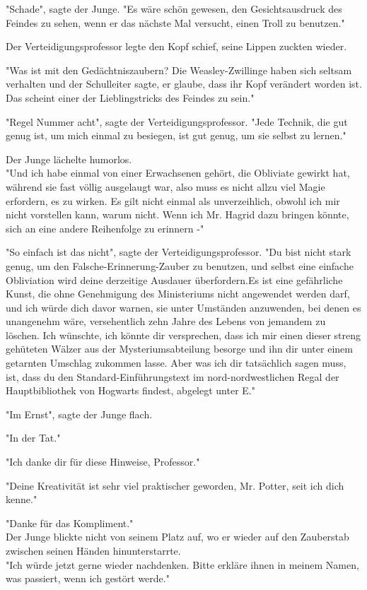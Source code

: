 {"Schade", sagte der Junge. "Es wäre schön gewesen, den Gesichtsausdruck des Feindes zu sehen, wenn er das nächste Mal versucht, einen Troll zu benutzen."

Der Verteidigungsprofessor legte den Kopf schief, seine Lippen zuckten wieder.

"Was ist mit den Gedächtniszaubern? Die Weasley-Zwillinge haben sich seltsam verhalten und der Schulleiter sagte, er glaube, dass ihr Kopf verändert worden ist. Das scheint einer der Lieblingstricks des Feindes zu sein."

"Regel Nummer acht", sagte der Verteidigungsprofessor. "Jede Technik, die gut genug ist, um mich einmal zu besiegen, ist gut genug, um sie selbst zu lernen."

Der Junge lächelte humorlos.\\ "Und ich habe einmal von einer Erwachsenen gehört, die Obliviate gewirkt hat, während sie fast völlig ausgelaugt war, also muss es nicht allzu viel Magie erfordern, es zu wirken. Es gilt nicht einmal als unverzeihlich, obwohl ich mir nicht vorstellen kann, warum nicht. Wenn ich Mr. Hagrid dazu bringen könnte, sich an eine andere Reihenfolge zu erinnern -"

"So einfach ist das nicht", sagte der Verteidigungsprofessor. "Du bist nicht stark genug, um den Falsche-Erinnerung-Zauber zu benutzen, und selbst eine einfache Obliviation wird deine derzeitige Ausdauer überfordern.Es ist eine gefährliche Kunst, die ohne Genehmigung des Ministeriums nicht angewendet werden darf, und ich würde dich davor warnen, sie unter Umständen anzuwenden, bei denen es unangenehm wäre, versehentlich zehn Jahre des Lebens von jemandem zu löschen. Ich wünschte, ich könnte dir versprechen, dass ich mir einen dieser streng gehüteten Wälzer aus der Mysteriumsabteilung besorge und ihn dir unter einem getarnten Umschlag zukommen lasse. Aber was ich dir tatsächlich sagen muss, ist, dass du den Standard-Einführungstext im nord-nordwestlichen Regal der Hauptbibliothek von Hogwarts findest, abgelegt unter E."

"Im Ernst", sagte der Junge flach.

"In der Tat."

"Ich danke dir für diese Hinweise, Professor."

"Deine Kreativität ist sehr viel praktischer geworden, Mr. Potter, seit ich dich kenne."

"Danke für das Kompliment."\\ Der Junge blickte nicht von seinem Platz auf, wo er wieder auf den Zauberstab zwischen seinen Händen hinunterstarrte.\\ "Ich würde jetzt gerne wieder nachdenken. Bitte erkläre ihnen in meinem Namen, was passiert, wenn ich gestört werde."

}
